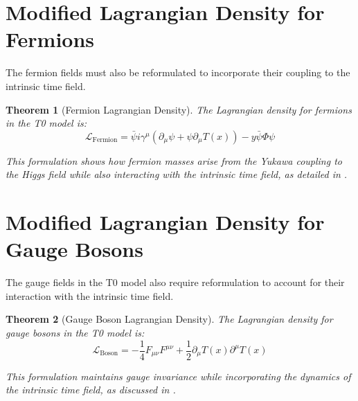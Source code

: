 \documentclass[12pt,a4paper]{article}
\newcommand{\Tfield}{T(x)}
\newtheorem{theorem}{Theorem}[section]
\theoremstyle{definition}
\theoremstyle{remark}
\begin{document}
	\section{Modified Lagrangian Density for Fermions}
	The fermion fields must also be reformulated to incorporate their coupling to the intrinsic time field.
	
	\begin{theorem}[Fermion Lagrangian Density]
		The Lagrangian density for fermions in the T0 model is:
		\begin{equation}
			\mathcal{L}_{\text{Fermion}} = \bar{\psi} i \gamma^\mu (\partial_\mu \psi + \psi \partial_\mu \Tfield) - y \bar{\psi} \Phi \psi
		\end{equation}
		
		This formulation shows how fermion masses arise from the Yukawa coupling to the Higgs field while also interacting with the intrinsic time field, as detailed in \cite{pascher_higgs_2025}.
	\end{theorem}
	
	\section{Modified Lagrangian Density for Gauge Bosons}
	The gauge fields in the T0 model also require reformulation to account for their interaction with the intrinsic time field.
	
	\begin{theorem}[Gauge Boson Lagrangian Density]
		The Lagrangian density for gauge bosons in the T0 model is:
		\begin{equation}
			\mathcal{L}_{\text{Boson}} = -\frac{1}{4} F_{\mu\nu} F^{\mu\nu} + \frac{1}{2} \partial_\mu \Tfield \partial^\mu \Tfield
		\end{equation}
		
		This formulation maintains gauge invariance while incorporating the dynamics of the intrinsic time field, as discussed in \cite{pascher_feldtheorie_2025}.
	\end{theorem}
	
\end{document}
